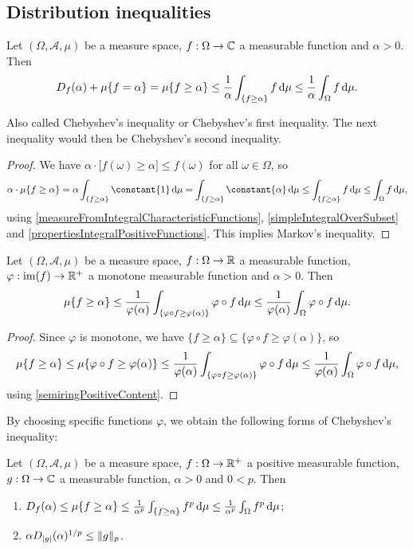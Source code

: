 \subsection{Distribution inequalities}
\begin{proposition}
Let $(\Omega, \mathcal{A}, \mu)$ be a measure space, $f:\Omega\to\mathbb{C}$ a measurable function and $\alpha>0$. Then
\[ D_f(\alpha) + \mu\{f = \alpha\} = \mu\{f\geq \alpha\} \leq \frac{1}{\alpha}\int_{\{f\geq \alpha\}}f\operatorname{d \!}{\mu} \leq \frac{1}{\alpha}\int_\Omega f\operatorname{d \!}{\mu}. \]
\end{proposition}
Also called Chebyshev's inequality or Chebyshev's first inequality. The next inequality would then be Chebyshev's second inequality. 
\begin{proof}
We have $\alpha\cdot \big[f(\omega)\geq \alpha\big]\leq f(\omega)$ for all $\omega\in\Omega$, so
\[ \alpha\cdot \mu\{f\geq \alpha\} = \alpha \int_{\{f\geq \alpha\}}\constant{1}\diff{\mu} = \int_{\{f\geq \alpha\}}\constant{\alpha}\diff{\mu} \leq \int_{\{f\geq \alpha\}}f\diff{\mu} \leq \int_\Omega f\diff{\mu}, \]
using \ref{measureFromIntegralCharacteristicFunctions}, \ref{simpleIntegralOverSubset} and \ref{propertiesIntegralPositiveFunctions}. This implies Markov's inequality.
\end{proof}
\begin{corollary}
Let $(\Omega, \mathcal{A}, \mu)$ be a measure space, $f:\Omega\to\mathbb{R}$ a measurable function, $\varphi:\operatorname{im}(f) \to \mathbb{R}^+$ a monotone measurable function and $\alpha>0$. Then
\[ \mu\{f\geq \alpha\} \leq \frac{1}{\varphi(\alpha)}\int_{\{\varphi\circ f \geq \varphi(\alpha)\}} \varphi\circ f\operatorname{d \!}{\mu} \leq \frac{1}{\varphi(\alpha)}\int_\Omega \varphi\circ f\operatorname{d \!}{\mu}. \]
\end{corollary}
\begin{proof}
Since $\varphi$ is monotone, we have $\{f\geq \alpha\} \subseteq \{\varphi\circ f\geq \varphi(\alpha)\}$, so
\[ \mu\{f\geq \alpha\} \leq \mu\{\varphi\circ f\geq \varphi(\alpha)\} \leq \frac{1}{\varphi(\alpha)}\int_{\{\varphi\circ f \geq \varphi(\alpha)\}} \varphi\circ f\operatorname{d \!}{\mu} \leq \frac{1}{\varphi(\alpha)}\int_\Omega \varphi\circ f\operatorname{d \!}{\mu}, \]
using \ref{semiringPositiveContent}.
\end{proof}
By choosing specific functions $\varphi$, we obtain the following forms of Chebyshev's inequality:
\begin{corollary} \label{ChebyshevInequalityCorollary}
Let $(\Omega, \mathcal{A}, \mu)$ be a measure space, $f:\Omega\to\mathbb{R}^+$ a positive measurable function, $g: \Omega\to \mathbb{C}$ a measurable function, $\alpha>0$ and $0<p$. Then
\begin{enumerate}
\item $D_f(\alpha) \leq \mu\{f\geq \alpha\} \leq \frac{1}{\alpha^p}\int_{\{f \geq \alpha\}} f^p\operatorname{d \!}{\mu} \leq \frac{1}{\alpha^p}\int_\Omega f^p\operatorname{d \!}{\mu}$;
\item $\alpha D_{|g|}(\alpha)^{1/p}\leq \lVert g\rVert_p$.
\end{enumerate}
\end{corollary}
